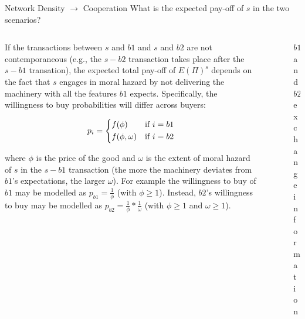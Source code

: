 \documentclass[notes, aspectratio=1610]{beamer}
\begin{document}
\begin{frame}
	{Network Density $\rightarrow$ Cooperation}
	{What is the expected pay-off of $s$ in the two scenarios?}
	\footnotesize
	\begin{columns}[t]
	\begin{column}{0.65\textwidth}
			
		If the transactions between $s$ and $b1$ and $s$ and $b2$ are 
			not contemporaneous (e.g., the $s-b2$ transaction takes place 
			after the $s-b1$ transation), the expected total pay-off of 
			$E(\Pi)^{s}$  depends on the fact that $s$ engages in moral 
			hazard by not delivering the machinery with all the 
			features $b1$ expects. Specifically, the willingness 
			to buy probabilities will differ across buyers:
			
			\[
			p_{i} =
			\begin{dcases}
				f(\phi) & \text{if} ~i = b1\\
				f(\phi, \omega) & \text{if} ~i = b2\\
				\end{dcases}
			\]
	
			where $\phi$ is the price of the good and 
			$\omega$ is the extent of moral hazard of $s$
			in the $s - b1$ transaction (the more the machinery 
			deviates from $b1$'s expectations, the larger $\omega$).
			For example the willingness to buy of $b1$ may be 
			modelled as $p_{b1} = \frac{1}{\phi}$ (with $\phi\geq 1$). 
			Instead, $b2$'s willingness to buy may be modelled as 
			$p_{b2} = \frac{1}{\phi} * \frac{1}{\omega}$ (with 
			$\phi\geq 1$ and $\omega\geq 1$).
			
	\end{column}
	\begin{column}{0.35\textwidth}
		\begin{figure}
		\resizebox{1\textwidth}{!}{
			\begin{center}
				
			\end{center}
			}
			\caption*{
				\footnotesize
				$b1$ and $b2$ exchange information
				}
		\end{figure}	
	\end{column}
	\end{columns}
\end{frame}
\end{document}
